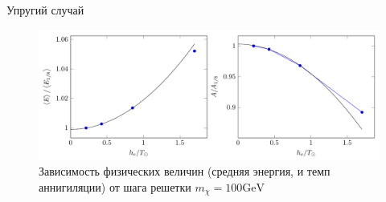 Упругий случай
\begin{figure}[!h]
	\centering
	\includegraphics[width=\textwidth]{images/ConvEl.png}
	\caption{Зависимость физических величин (средняя энергия, и темп аннигиляции) от шага решетки $m_{\chi} = 100 \text{GeV}$}
\end{figure}